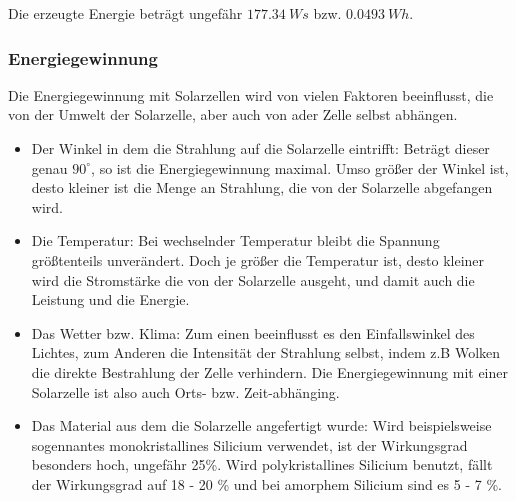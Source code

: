         Die erzeugte Energie beträgt ungefähr $177.34\ Ws$ bzw. $0.0493\ Wh$.

        
        
        
        
        
    \subsubsection{Energiegewinnung}                                    %
        \par Die Energiegewinnung mit Solarzellen wird von vielen Faktoren beeinflusst, die von der Umwelt der Solarzelle, aber auch von ader Zelle selbst abhängen.
        \begin{itemize}
            \item Der Winkel in dem die Strahlung auf die Solarzelle eintrifft: Beträgt dieser genau $90^{\circ}$, so ist die Energiegewinnung maximal. Umso größer der Winkel ist, desto kleiner ist die Menge an Strahlung, die von der Solarzelle abgefangen wird.
            \item Die Temperatur: Bei wechselnder Temperatur bleibt die Spannung größtenteils unverändert. Doch je größer die Temperatur ist, desto kleiner wird die Stromstärke die von der Solarzelle ausgeht, und damit auch die Leistung und die Energie.
            \item Das Wetter bzw. Klima: Zum einen beeinflusst es den Einfallswinkel des Lichtes, zum Anderen die Intensität der Strahlung selbst, indem z.B Wolken die direkte Bestrahlung der Zelle verhindern. Die Energiegewinnung mit einer Solarzelle ist also auch Orts- bzw. Zeit-abhänging.
            \item Das Material aus dem die Solarzelle angefertigt wurde: Wird beispielsweise sogennantes monokristallines Silicium verwendet, ist der Wirkungsgrad besonders hoch, ungefähr 25\%. Wird polykristallines Silicium benutzt, fällt der Wirkungsgrad auf 18 - 20 \% und bei amorphem Silicium sind es 5 - 7 \%. 
        \end{itemize}
